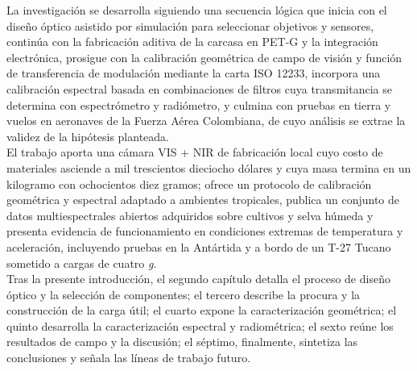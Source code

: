 \noindent La investigación se desarrolla siguiendo una secuencia lógica que inicia
con el diseño óptico asistido por simulación para seleccionar
objetivos y sensores, continúa con la fabricación aditiva de la carcasa
en PET-G y la integración electrónica, prosigue con la calibración
geométrica de campo de visión y función de transferencia de modulación
mediante la carta ISO 12233, incorpora una calibración espectral basada
en combinaciones de filtros cuya transmitancia se determina con
espectrómetro y radiómetro, y culmina con pruebas en tierra y vuelos en
aeronaves de la Fuerza Aérea Colombiana, de cuyo análisis se extrae la
validez de la hipótesis planteada.\\

\noindent El trabajo aporta una cámara VIS + NIR de fabricación local cuyo costo
de materiales asciende a mil trescientos dieciocho dólares y cuya masa
termina en un kilogramo con ochocientos diez gramos; ofrece un protocolo
de calibración geométrica y espectral adaptado a ambientes tropicales,
publica un conjunto de datos multiespectrales abiertos adquiridos sobre
cultivos y selva húmeda y presenta evidencia de funcionamiento en
condiciones extremas de temperatura y aceleración, incluyendo pruebas en
la Antártida y a bordo de un T-27 Tucano sometido a cargas de cuatro
\emph{g}.\\

\noindent Tras la presente introducción, el segundo capítulo detalla el proceso de
diseño óptico y la selección de componentes; el tercero describe la
procura y la construcción de la carga útil; el cuarto expone la
caracterización geométrica; el quinto desarrolla la caracterización
espectral y radiométrica; el sexto reúne los resultados de campo y la
discusión; el séptimo, finalmente, sintetiza las conclusiones y señala
las líneas de trabajo futuro.\\


